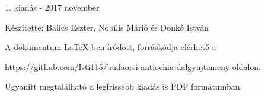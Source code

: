 \documentclass[a5paper,twoside]{article}
\renewcommand{\_}[1]{\underline{#1}} %
\begin{document}
  \renewcommand{\thesongnum}{K\arabic{songnum}}
  \begin{songs}{}
    
  \end{songs}

  \renewcommand{\thesongnum}{M\arabic{songnum}}
  \setlength{\songnumwidth}{1.25cm}
  \begin{songs}{}
    
  \end{songs}

  \newpage
  \thispagestyle{empty}

  \vspace*{\fill}
  1. kiadás - 2017 november

  \vspace{0.3cm}

  Készítette: Balics Eszter, Nobilis Márió és Donkó István

  \vspace{0.3cm}

  A dokumentum LaTeX-ben íródott, forráskódja elérhető a

  https://github.com/Isti115/budaorsi-antiochia-dalgyujtemeny oldalon.

  Ugyanitt megtalálható a legfrissebb kiadás is PDF formátumban.
\end{document}
